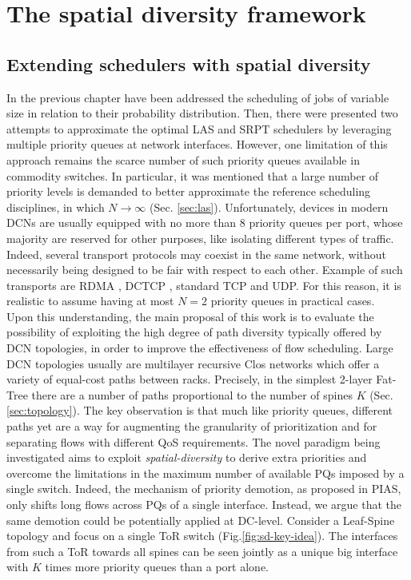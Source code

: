 \chapter{The spatial diversity framework}
\label{ch:sdframework}
\section{Extending schedulers with spatial diversity}

In the previous chapter have been addressed the scheduling of jobs of variable size in relation to their probability distribution. Then, there were presented two attempts to approximate the optimal LAS and SRPT schedulers by leveraging multiple priority queues at network interfaces. However, one limitation of this approach remains the scarce number of such priority queues available in commodity switches. In particular, it was mentioned that a large number of priority levels is demanded to better approximate the reference scheduling disciplines, in which $N \rightarrow \infty$ (Sec. \ref{sec:las}). Unfortunately, devices in modern DCNs are usually equipped with no more than 8 priority queues per port, whose majority are reserved for other purposes, like isolating different types of traffic. Indeed, several transport protocols may coexist in the same network, without necessarily being designed to be fair with respect to each other. Example of such transports are RDMA \cite{rdma}, DCTCP \cite{dctcp}, standard TCP and UDP. For this reason, it is realistic to assume having at most $N=2$ priority queues in practical cases. \\
Upon this understanding, the main proposal of this work is to evaluate the possibility of exploiting the high degree of path diversity typically offered by DCN topologies, in order to improve the effectiveness of flow scheduling. Large DCN topologies usually are multilayer recursive Clos networks which offer a variety of equal-cost paths between racks. Precisely, in the simplest 2-layer Fat-Tree there are a number of paths proportional to the number of spines $K$ (Sec. \ref{sec:topology}). The key observation is that much like priority queues, different paths yet are a way for augmenting the granularity of prioritization and for separating flows with different QoS requirements. The novel paradigm being investigated aims to exploit \emph{spatial-diversity} to derive extra priorities and overcome the limitations in the maximum number of available PQs imposed by a single switch. Indeed, the mechanism of priority demotion, as proposed in PIAS, only shifts long flows across PQs of a single interface. Instead, we argue that the same demotion could be potentially applied at DC-level. Consider a Leaf-Spine topology and focus on a single ToR switch (Fig.\ref{fig:sd-key-idea}). The interfaces from such a ToR towards all spines can be seen jointly as a unique big interface with $K$ times more priority queues than a port alone.
